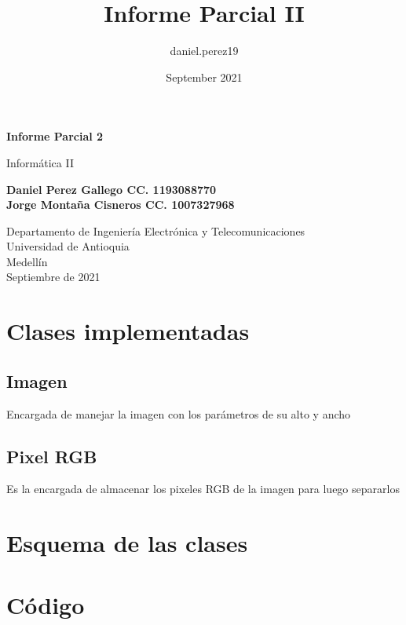 \documentclass{article}
\title{Informe Parcial II}
\author{daniel.perez19 }
\date{September 2021}
\begin{document}
\begin{titlepage}
    \begin{center}
        \vspace*{1cm}
            
        \Huge
        \textbf{Informe Parcial 2}
            
        \vspace{0.5cm}
        \LARGE
        Informática II
            
        \vspace{1.5cm}
            
        \textbf{Daniel Perez Gallego CC. 1193088770\\Jorge Montaña Cisneros CC.  1007327968}
            
        \vfill
            
        \vspace{0.8cm}
            
        \Large
        Departamento de Ingeniería Electrónica y Telecomunicaciones\\
        Universidad de Antioquia\\
        Medellín\\
        Septiembre de 2021
            
    \end{center}
\end{titlepage}

\tableofcontents
\vspace{2cm}
\section{Clases implementadas}
\subsection{Imagen}
Encargada de manejar la imagen con los parámetros de su alto y ancho\\
\subsection{Pixel RGB}
Es la encargada de almacenar los pixeles RGB de la imagen para luego separarlos\\

\section{Esquema de las clases}

\section{Código}
\end{document}
